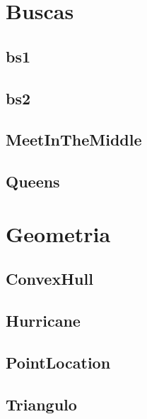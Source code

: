\section{Buscas}
\subsection{bs1}
\raggedbottom
\hrulefill
\subsection{bs2}
\raggedbottom
\hrulefill
\subsection{MeetInTheMiddle}
\raggedbottom
\hrulefill
\subsection{Queens}
\raggedbottom
\hrulefill

\section{Geometria}
\subsection{ConvexHull}
\raggedbottom
\hrulefill
\subsection{Hurricane}
\raggedbottom
\hrulefill
\subsection{PointLocation}
\raggedbottom
\hrulefill
\subsection{Triangulo}
\raggedbottom
\hrulefill

